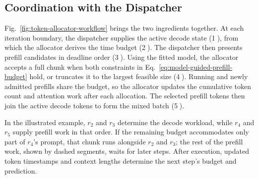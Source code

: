 \subsection{Coordination with the Dispatcher}
\label{subsec:token-allocation-workflow}

Fig.~\ref{fig:token-allocator-workflow} brings the two ingredients together.
At each iteration boundary, the dispatcher supplies the active decode state (\textcircled{\scriptsize 1}), from which the allocator derives the time budget (\textcircled{\scriptsize 2}).
The dispatcher then presents prefill candidates in deadline order (\textcircled{\scriptsize 3}).
Using the fitted model, the allocator accepts a full chunk when both constraints in Eq.~\ref{eq:model-guided-prefill-budget} hold, or truncates it to the largest feasible size (\textcircled{\scriptsize 4}).
Running and newly admitted prefills share the budget, so the allocator updates the cumulative token count and attention work after each allocation.
The selected prefill tokens then join the active decode tokens to form the mixed batch (\textcircled{\scriptsize 5}).

In the illustrated example, $r_2$ and $r_3$ determine the decode workload, while $r_4$ and $r_5$ supply prefill work in that order.
If the remaining budget accommodates only part of $r_4$'s prompt, that chunk runs alongside $r_2$ and $r_3$; the rest of the prefill work, shown by dashed segments, waits for later steps.
After execution, updated token timestamps and context lengths determine the next step's budget and prediction.
